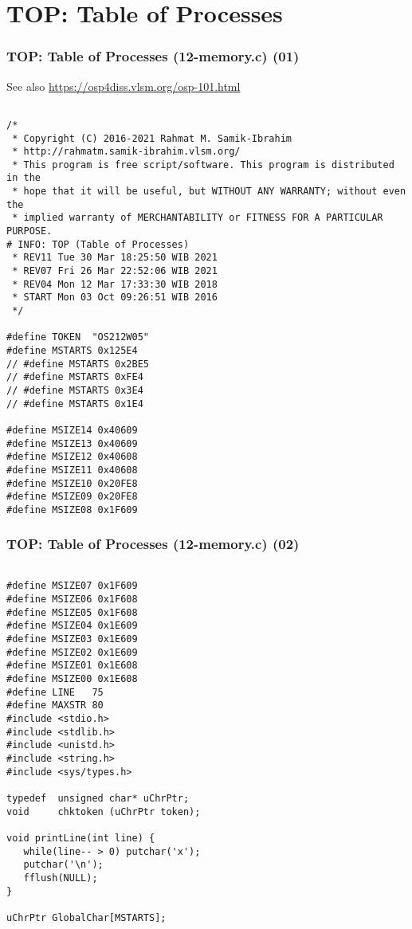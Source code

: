 \documentclass[aspectratio=169, xcolor=table, notheorems, hyperref={pdfpagelabels=false}]{beamer}
\begin{document}
\section{TOP: Table of Processes}
\begin{frame}[fragile]
\frametitle{TOP: Table of Processes (12-memory.c) (01)}

See also \url{https://osp4diss.vlsm.org/osp-101.html}

\begin{lstlisting}[basicstyle=\ttfamily\tiny]

/*
 * Copyright (C) 2016-2021 Rahmat M. Samik-Ibrahim
 * http://rahmatm.samik-ibrahim.vlsm.org/
 * This program is free script/software. This program is distributed in the 
 * hope that it will be useful, but WITHOUT ANY WARRANTY; without even the 
 * implied warranty of MERCHANTABILITY or FITNESS FOR A PARTICULAR PURPOSE.
# INFO: TOP (Table of Processes)
 * REV11 Tue 30 Mar 18:25:50 WIB 2021
 * REV07 Fri 26 Mar 22:52:06 WIB 2021
 * REV04 Mon 12 Mar 17:33:30 WIB 2018
 * START Mon 03 Oct 09:26:51 WIB 2016
 */

#define TOKEN  "OS212W05"
#define MSTARTS 0x125E4
// #define MSTARTS 0x2BE5
// #define MSTARTS 0xFE4
// #define MSTARTS 0x3E4
// #define MSTARTS 0x1E4

#define MSIZE14 0x40609
#define MSIZE13 0x40609
#define MSIZE12 0x40608
#define MSIZE11 0x40608
#define MSIZE10 0x20FE8
#define MSIZE09 0x20FE8
#define MSIZE08 0x1F609

\end{lstlisting}
\end{frame}

\begin{frame}[fragile]
\frametitle{TOP: Table of Processes (12-memory.c) (02)}
\begin{lstlisting}[basicstyle=\ttfamily\tiny]

#define MSIZE07 0x1F609
#define MSIZE06 0x1F608
#define MSIZE05 0x1F608
#define MSIZE04 0x1E609
#define MSIZE03 0x1E609
#define MSIZE02 0x1E609
#define MSIZE01 0x1E608
#define MSIZE00 0x1E608
#define LINE   75
#define MAXSTR 80
#include <stdio.h>
#include <stdlib.h>
#include <unistd.h>
#include <string.h>
#include <sys/types.h>

typedef  unsigned char* uChrPtr;
void     chktoken (uChrPtr token);

void printLine(int line) {
   while(line-- > 0) putchar('x');
   putchar('\n');
   fflush(NULL);
}

uChrPtr GlobalChar[MSTARTS];

\end{lstlisting}
\end{frame}
\end{document}
